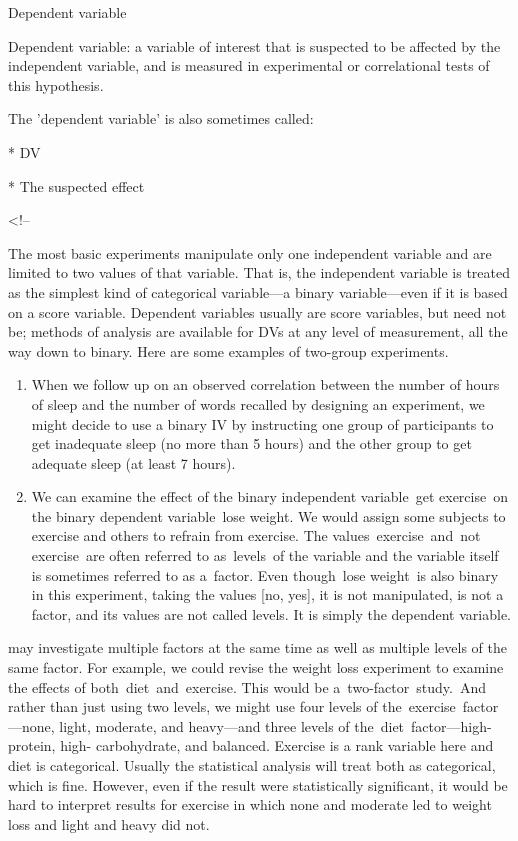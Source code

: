 \begin{refsection}
Dependent variable
\begin{thesis}
Dependent variable: a variable of interest that is suspected to be affected by the independent variable, and is measured in experimental or correlational tests of this hypothesis.

The 'dependent variable' is also sometimes called:

* DV

* The suspected effect

<!--\end{thesis}
The most basic experiments manipulate only one independent variable and are limited to two values of that variable. That is, the independent variable is treated as the simplest kind of categorical variable---a binary variable---even if it is based on a score variable. Dependent variables usually are score variables, but need not be; methods of analysis are available for DVs at any level of measurement, all the way down to binary. Here are some examples of two-group experiments.

\begin{enumerate}
\item When we follow up on an observed correlation between the number of hours of sleep and the number of words recalled by designing an experiment, we might decide to use a binary IV by instructing one group of participants to get inadequate sleep (no more than 5 hours) and the other group to get adequate sleep (at least 7 hours).

\item We can examine the effect of the binary independent variable get exercise on the binary dependent variable lose weight. We would assign some subjects to exercise and others to refrain from exercise. The values exercise and not exercise are often referred to as levels of the variable and the variable itself is sometimes referred to as a factor. Even though lose weight is also binary in this experiment, taking the values [no, yes], it is not manipulated, is not a factor, and its values are not called levels. It is simply the dependent variable.

\end{enumerate}

 may investigate multiple factors at the same time as well as multiple levels of the same factor. For example, we could revise the weight loss experiment to examine the effects of both diet and exercise. This would be a two-factor study. And rather than just using two levels, we might use four levels of the exercise factor---none, light, moderate, and heavy---and three levels of the diet factor---high-protein, high- carbohydrate, and balanced. Exercise is a rank variable here and diet is categorical. Usually the statistical analysis will treat both as categorical, which is fine. However, even if the result were statistically significant, it would be hard to interpret results for exercise in which none and moderate led to weight loss and light and heavy did not.


\end{refsection}

